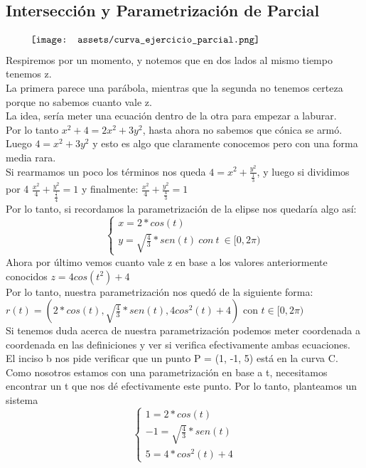 \documentclass[10pt,a4paper]{article}
\begin{document}
\subsection*{Intersección y Parametrización de Parcial}
\[\begin{minipage}[b]{0.9\textwidth}
    \texttt{[image: assets/curva\_ejercicio\_parcial.png]}
\end{minipage}\]
Respiremos por un momento, y notemos que en dos lados al mismo tiempo tenemos z. \\
La primera parece una parábola, mientras que la segunda no tenemos certeza porque no sabemos cuanto vale z. \\
La idea, sería meter una ecuación dentro de la otra para empezar a laburar. \\
Por lo tanto $x^{2}+4 = 2x^{2}+3y^{2}$, hasta ahora no sabemos que cónica se armó. \\
Luego $4 = x^{2}+3y^{2}$ y esto es algo que claramente conocemos pero con una forma media rara. \\
Si rearmamos un poco los términos nos queda $4 = x^{2} + \frac{y^{2}}{\frac{1}{3}}$, y luego si dividimos por 4 $\frac{x^{2}}{4} + \frac{y^{2}}{\frac{\frac{1}{3}}{4}} = 1$ y finalmente: $\frac{x^{2}}{4} + \frac{y^{2}}{\frac{4}{3}} = 1$ \\
Por lo tanto, si recordamos la parametrización de la elipse nos quedaría algo así: 
\[
\begin{cases}
    x = 2 * cos(t) \\
    y = \sqrt{\frac{4}{3}} * sen(t) \ con \ t \ \in [0, 2\pi)
\end{cases}
\] 
Ahora por último vemos cuanto vale z en base a los valores anteriormente conocidos $ z = 4 cos(t^{2}) + 4$ \\
Por lo tanto, nuestra parametrización nos quedó de la siguiente forma: $r(t) = (2 * cos(t), \sqrt{\frac{4}{3}} * sen(t), 4 cos^{2}(t) + 4)$ con $t \in [0, 2\pi)$ \\
Si tenemos duda acerca de nuestra parametrización podemos meter coordenada a coordenada en las definiciones y ver si verifica efectivamente ambas ecuaciones. \\
El inciso b nos pide verificar que un punto P = (1, -1, 5) está en la curva C. Como nosotros estamos con una parametrización en base a t, necesitamos encontrar un t que nos dé efectivamente este punto. Por lo tanto, planteamos un sistema
\[
\begin{cases}
    1 = 2 * cos(t) \\
    -1 = \sqrt{\frac{4}{3}} * sen(t) \\
    5 = 4 * cos^{2}(t) + 4
\end{cases}
\] 
\end{document}
